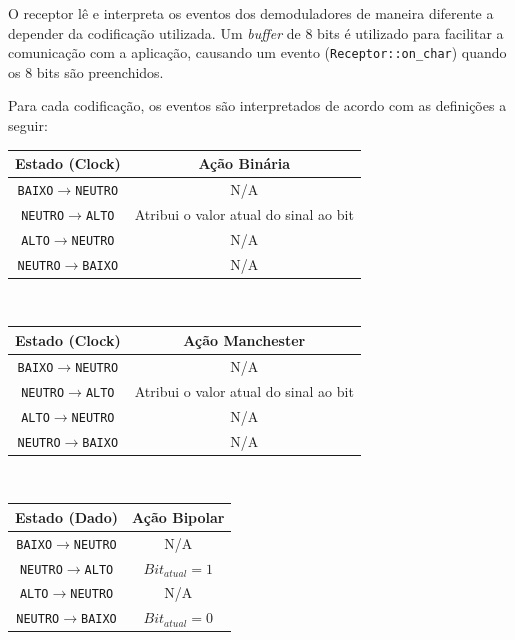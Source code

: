 \documentclass[titlepage,twocolumn]{article}
\begin{document}
O receptor lê e interpreta os eventos dos demoduladores de maneira diferente a depender da codificação utilizada. Um \textit{buffer} de 8 bits é utilizado para facilitar a comunicação com a aplicação, causando um evento (\texttt{Receptor::on\_char}) quando os 8 bits são preenchidos.

Para cada codificação, os eventos são interpretados de acordo com as definições a seguir:

\begin{center}
    \begin{tabular}{|c | c |}
        \hline
        Estado (Clock) & Ação Binária\\
        \hline
        \texttt{BAIXO}$\rightarrow$\texttt{NEUTRO} & N/A\\
        \texttt{NEUTRO}$\rightarrow$\texttt{ALTO} & Atribui o valor atual do sinal ao bit\\
        \texttt{ALTO}$\rightarrow$\texttt{NEUTRO} & N/A\\
        \texttt{NEUTRO}$\rightarrow$\texttt{BAIXO} & N/A\\
        \hline
    \end{tabular}\\
\end{center}

\begin{center}
    \begin{tabular}{|c | c |}
        \hline
        Estado (Clock) & Ação Manchester\\
        \hline
        \texttt{BAIXO}$\rightarrow$\texttt{NEUTRO} & N/A\\
        \texttt{NEUTRO}$\rightarrow$\texttt{ALTO} & Atribui o valor atual do sinal ao bit\\
        \texttt{ALTO}$\rightarrow$\texttt{NEUTRO} & N/A\\
        \texttt{NEUTRO}$\rightarrow$\texttt{BAIXO} & N/A\\
        \hline
    \end{tabular}\\
\end{center}

\begin{center}
    \begin{tabular}{|c | c |}
        \hline
        Estado (Dado) & Ação Bipolar\\
        \hline
        \texttt{BAIXO}$\rightarrow$\texttt{NEUTRO} & N/A\\
        \texttt{NEUTRO}$\rightarrow$\texttt{ALTO} & $Bit_{atual} = 1$\\
        \texttt{ALTO}$\rightarrow$\texttt{NEUTRO} & N/A\\
        \texttt{NEUTRO}$\rightarrow$\texttt{BAIXO} & $Bit_{atual} = 0$\\
        \hline
    \end{tabular}\\
\end{center}
\end{document}
